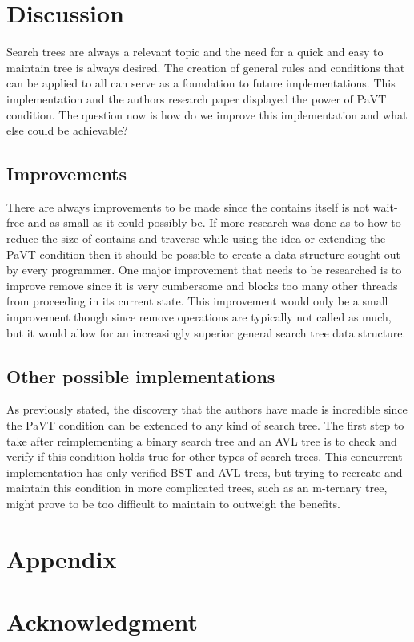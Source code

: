 \documentclass[conference]{IEEEtran}
\begin{document}
\section{Discussion}
Search trees are always a relevant topic and the need for a quick and easy to maintain tree is always desired. The creation of general rules and conditions that can be applied to all can serve as a foundation to future implementations. This implementation and the authors research paper \cite{b1} displayed the power of PaVT condition. The question now is how do we improve this implementation and what else could be achievable?
\subsection{Improvements}
There are always improvements to be made since the contains itself is not wait-free and as small as it could possibly be. If more research was done as to how to reduce the size of contains and traverse while using the idea or extending the PaVT condition then it should be possible to create a data structure sought out by every programmer. One major improvement that needs to be researched is to improve remove since it is very cumbersome and blocks too many other threads from proceeding in its current state. This improvement would only be a small improvement though since remove operations are typically not called as much, but it would allow for an increasingly superior general search tree data structure.
\subsection{Other possible implementations}
As previously stated, the discovery that the authors have made is incredible since the PaVT condition can be extended to any kind of search tree. The first step to take after reimplementing a binary search tree and an AVL tree is to check and verify if this condition holds true for other types of search trees. This concurrent implementation has only verified BST and AVL trees, but trying to recreate and maintain this condition in more complicated trees, such as an m-ternary tree, might prove to be too difficult to maintain to outweigh the benefits.


\section{Appendix}

\section*{Acknowledgment}
\end{document}
